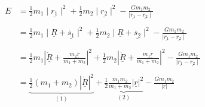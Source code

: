 \begin{align*}
  E &= \frac{1}{2}m_{1}\mid \underline{r_{1}} \mid^{2} + \frac{1}{2}m_{2} \mid \underline{r_{2}} \mid^{2} - \frac{Gm_{1}m_{2}}{\mid \underline{r_{1}} - \underline{r_{2}} \mid} \\ \\
    &= \frac{1}{2}m_{1} \mid \underline{R} + \underline{\dot{s_{1}}} \mid^{2} +  \frac{1}{2}m_{2} \mid \underline{R} + \underline{\dot{s_{2}}} \mid^{2} - \frac{Gm_{1}m_{2}}{\mid \underline{r_{1}} - \underline{r_{2}} \mid} \\ \\
    &= \frac{1}{2}m_{1} \left| \underline{\dot{R}} + \frac{m_{2}\underline{\dot{r}}}{m_{1} + m_{2}} \right|^{2}
      + \frac{1}{2} m_{2}\left| \underline{\dot{R}} + \frac{m_{1}\underline{\dot{r}}}{m_{1} + m_{2}} \right|^{2}
      - \frac{Gm_{1}m_{2}}{\mid \underline{r_{1}} - \underline{r_{2}} \mid} \\ \\
  &=  \underbrace{\frac{1}{2}(m_{1} + m_{2})\left| \underline{\dot{R}} \right|^{2}}_{(1)} + \underbrace{\frac{1}{2}\frac{m_{1}m_{2}}{m_{1} + m_{2}}\left| \underline{r} \right|^{2}}_{(2)} - \frac{Gm_{1}m_{2}}{|\underline{r}|} \tag{$*G$} \label{eq:item-stuff-ke}
\end{align*}
